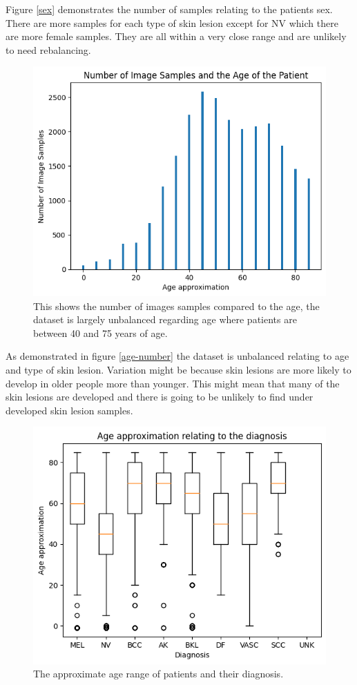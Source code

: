 Figure \ref{sex} demonstrates the number of samples relating to the patients sex. There are more samples for each type of skin lesion except for NV which there are more female samples. They are all within a very close range and are unlikely to need rebalancing.

\begin{figure}
	\centering
	\includegraphics[scale=0.8]{images/ISIC/age-number.png}
	\caption{This shows the number of images samples compared to the age, the dataset is largely unbalanced regarding age where patients are between 40 and 75 years of age.} 
\end{figure} \label{age-number}

As demonstrated in figure \ref{age-number} the dataset is unbalanced relating to age and type of skin lesion. Variation might be because skin lesions are more likely to develop in older people more than younger. This might mean that many of the skin lesions are developed and there is going to be unlikely to find under developed skin lesion samples.

\begin{figure}
	\centering
	\includegraphics[scale=0.8]{images/ISIC/diagnosis-age.png}
	\caption{The approximate age range of patients and their diagnosis.} 
\end{figure} \label{diagnosis-age}

